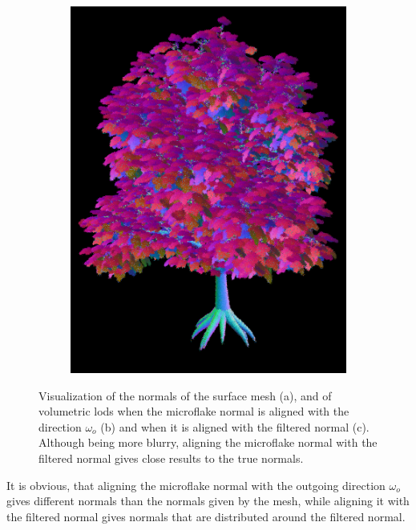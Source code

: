 \begin{figure}[ht]
\begin{subfigure}[b]{0.3\linewidth}
        \includegraphics[width=1\linewidth]{img/normal_map_vndf_normal_aligned.png}
        \caption{}
    \end{subfigure}
    \caption[Visualization of normals with meshes and volumes]{Visualization of the normals of the surface mesh (a), and of volumetric \acsp{lod} when the microflake normal is aligned with the direction $\omega_o$ (b) and when it is aligned with the filtered normal (c).
             Although being more blurry, aligning the microflake normal with the filtered normal gives close results to the true normals.}
	\label{fig:tree_normal_maps}
\end{figure}
It is obvious, that aligning the microflake normal with the outgoing direction $\omega_o$ gives different normals than the normals given by the mesh, while aligning it with the filtered normal gives normals that are distributed around the filtered normal.